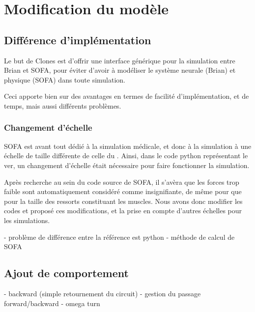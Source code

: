 \chapter{Modification du modèle} %
\label{cha:Modification du modèle}

\section{Différence d'implémentation} %
\label{sec:Différence d'implémentation}

Le but de Clones est d'offrir une interface générique pour
la simulation entre Brian et SOFA, pour éviter d'avoir à modéliser
le système neurale (Brian) et physique (SOFA) dans toute simulation.

Ceci apporte bien sur des avantages en termes de facilité d'implémentation,
et de temps, mais aussi différents problèmes.

\subsection{Changement d'échelle} %
\label{sbu:Changement d'échelle}

SOFA est avant tout dédié à la simulation médicale, et donc à la simulation
à une échelle de taille différente de celle du \celeg{}. Ainsi, dans le code
python représentant le ver, un changement d'échelle était nécessaire pour
faire fonctionner la simulation.

Après recherche au sein du code source de SOFA, il s'avèra que les forces trop
faible sont automatiquement considéré comme insignifiante, de même pour que pour la taille
des ressorts constituant les muscles. Nous avons donc modifier les codes et proposé
ces modifications, et la prise en compte d'autres échelles pour les simulations.




- problème de différence entre la référence est python
- méthode de calcul de SOFA


\section{Ajout de comportement} %
\label{sec:Ajout de comportement}

- backward (simple retournement du circuit)
  - gestion du passage forward/backward
- omega turn


